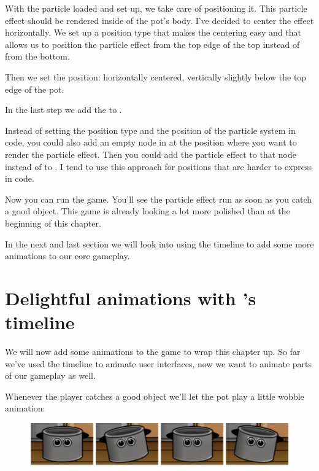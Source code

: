 With the particle loaded and set up, we take care of positioning it. This
particle effect should be rendered inside of the pot's body. I've decided to
center the effect horizontally. We set up a position type that makes the
centering easy and that allows us to position the particle effect from the top
edge of the top instead of from the bottom.

Then we set the position: horizontally centered, vertically slightly below the
top edge of the pot.

In the last step we add the  to .

\begin{details}[frametitle={An alternative positioning approach}]
Instead of setting the position type and the position of the particle system in
code, you could also add an empty node in \SB{} at the position where you want
to render the particle effect. Then you could add the particle effect to that
node instead of to . I tend to use this approach for
positions that are harder to express in code.
\end{details}

Now you can run the game. You'll see the particle effect run as soon as you
catch a good object. This game is already looking a lot more polished than at
the beginning of this chapter.

In the next and last section we will look into using the \SB{} timeline to add
some more animations to our core gameplay.

\section{Delightful animations with \SB{}'s timeline}
We will now add some animations to the game to wrap this chapter up. So far
we've used the \SB{} timeline to animate user interfaces, now we want to
animate parts of our gameplay as well.

Whenever the player catches a good object we'll let the pot play a little wobble
animation:

\begin{figure}[H]
  \centering
  \includegraphics[width=0.8\linewidth]{images/Chapter9/wobble_animation.png}
\end{figure}

